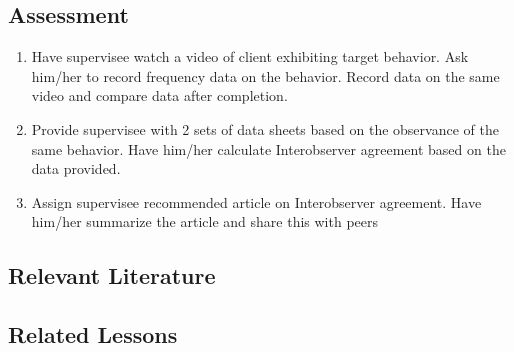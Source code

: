 \subsection{Assessment}
\begin{enumerate}
\item Have supervisee watch a video of client exhibiting target behavior. Ask him/her to record frequency data on the behavior. Record data on the same video and compare data after completion. 
\item Provide supervisee with 2 sets of data sheets based on the observance of the same behavior. Have him/her calculate Interobserver agreement based on the data provided.
\item Assign supervisee recommended article on Interobserver agreement. Have him/her summarize the article and share this with peers 
\end{enumerate}
%
\subsection{Relevant Literature}
\begin{refsection}
\nocite{cooper2007applied,boyce2000evaluation,johnston2010strategies,watkins2000interobserver}
\printbibliography[heading=none]
\end{refsection}
%
\subsection{Related Lessons}
\fouraOne{}\\
\fouraNine{}\\
\fourbTwo{}\\
\fourgSix{}\\
\fourhTwo{}\\
\fouriOne{}\\
\fouriFive{}\\
\fourjNine{}\\
\fourkFive{}\\
